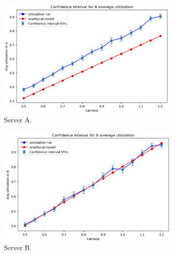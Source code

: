 \begin{figure}
    \centering
    \begin{subfigure}{0.49\linewidth}
        \centering
        \includegraphics[width=1\linewidth]{figs//results//obj2//verification/obj2_lineplots_utilization_A.png}
        \caption{Server A.}
        \label{fig:obj2_lineplots_utilization_A}
    \end{subfigure} 
    \begin{subfigure}{0.49\linewidth}
        \centering
        \includegraphics[width=1\linewidth]{figs//results//obj2//verification/obj2_lineplots_utilization_B.png}
        \caption{Server B.}
        \label{fig:obj2_lineplots_utilization_B}
    \end{subfigure}
    \begin{subfigure}{0.5\linewidth}
        \centering

\end{subfigure}
\end{figure}
